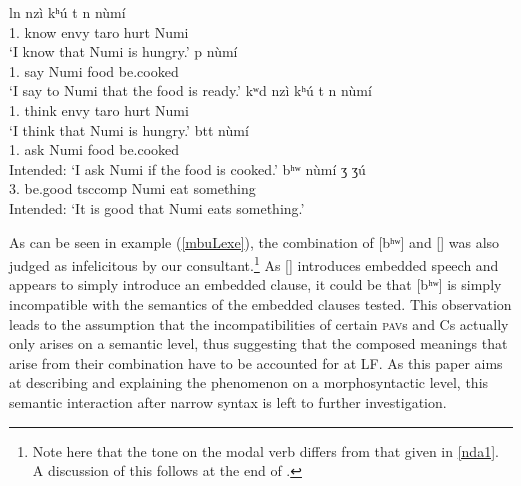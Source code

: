 \documentclass[output=paper,colorlinks,citecolor=brown]{langscibook}
\begin{document}
\ea \label{mbuLex}
    \begin{xlist}
    \ex \label{mbuLexa}
         {l\epH n} {\mbuL} {nzì} {kʰ{ú}} {\epL\epH t} {n\dz\epH} {n{ù}m{í}} \\
             {1.} {know} {} {envy} {taro} {} {hurt} {Numi} \\
        \glt `I know that Numi is hungry.'
    \ex \label{mbuLexb}
         {p} {n{ù}m{í}} {\mbuL} {\ch\schwaL{}} {\ds\textscb\schwaH} \\
             {1.} {say} {Numi} {} {food} {be.cooked} \\
        \glt `I say to Numi that the food is ready.'
    \ex \label{mbuLexc}
         {kʷ\epL d\schwaL} {\mbuL} {nzì} {kʰ{ú}} {\epL\epH t} {n\dz\epH} {n{ù}m{í}} \\
             {1.} {think} {} {envy} {taro} {} {hurt} {Numi} \\
        \glt `I think that Numi is hungry.'
    \ex \label{mbuLexd}
         {b\epH tt\schwaH} {n{ù}m{í}} {\mbuL} {\ch\schwaL{}} {\ds\textscb\schwaH} \\
             {1.} {ask} {Numi} {} {food} {be.cooked} \\
        \glt Intended: `I ask Numi if the food is cooked.'
    \ex \label{mbuLexe}
         {bʰʷ\ooL} {\mbuL} {n{ù}m{í}} {ʒ\baruH\baruL} {ʒ{ú}} \\
             {3.} {be.good} {tsc{comp}} {Numi} {eat} {something} \\
        \glt Intended: `It is good that Numi eats something.'
    \end{xlist}
\z

As can be seen in example (\ref{mbuLexe}), the combination of [bʰʷ\ooL] and [\mbuL] was also judged as infelicitous by our consultant.\footnote{Note here that the tone on the modal verb differs from that given in \ref{nda1}. A discussion of this follows at the end of .} As [\mbuL] introduces embedded speech and appears to simply introduce an embedded clause, it could be that [bʰʷ\ooL] is simply incompatible with the semantics of the embedded clauses tested. This observation leads to the assumption that the incompatibilities of certain \textsc{pav}s and Cs actually only arises on a semantic level, thus suggesting that the composed meanings that arise from their combination have to be accounted for at LF. As this paper aims at describing and explaining the phenomenon on a morphosyntactic level, this semantic interaction after narrow syntax is left to further investigation.
\end{document}
